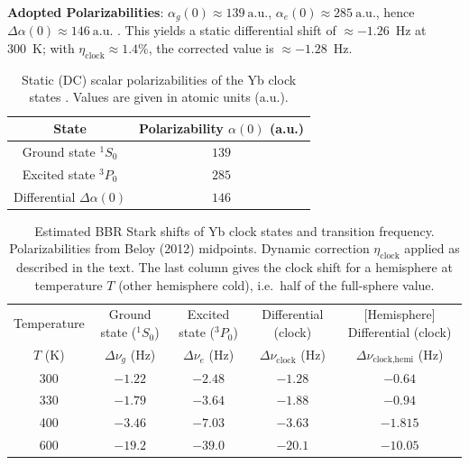 \documentclass[aps,pra, onecolumn,superscriptaddress,nopacs,floatfix, showkeys, notitlepage]{revtex4-1}
\begin{document}
{\bf Adopted Polarizabilities}:
$\alpha_g(0)\approx 139~\mathrm{a.u.}$, $\alpha_e(0)\approx 285~\mathrm{a.u.}$, hence $\Delta\alpha(0)\approx 146~\mathrm{a.u.}$ \cite{Beloy2012}.  
This yields a static differential shift of $\approx -1.26$~Hz at 300~K; with $\eta_\text{clock}\approx 1.4\%$, the corrected value is $\approx -1.28$~Hz.

\begin{table}[h!]
\centering
\caption{Static (DC) scalar polarizabilities of the Yb clock states \cite{Beloy2012}. 
Values are given in atomic units (a.u.).}
\begin{tabular}{c c}
\hline
State & Polarizability $\alpha(0)$ (a.u.) \\
\hline
Ground state ${}^{1}S_{0}$ & $139$ \\
Excited state ${}^{3}P_{0}$ & $285$ \\
\hline
Differential $\Delta\alpha(0)$ & $146$ \\
\hline
\end{tabular}
\end{table}


\begin{table}[h!]
\centering
\caption{Estimated BBR Stark shifts of Yb clock states and transition frequency. 
Polarizabilities from Beloy (2012) midpoints. Dynamic correction 
$\eta_\text{clock}$ applied as described in the text. The last column gives the
clock shift for a hemisphere at temperature $T$ (other hemisphere cold), i.e.\ half of the full-sphere value.}
\begin{tabular}{c c c c | c}
\hline
Temperature & Ground state (${}^{1}S_{0}$) & Excited state (${}^{3}P_{0}$) & Differential (clock) & [Hemisphere] Differential (clock) \\
$T$ (K) & $\Delta\nu_g$ (Hz) & $\Delta\nu_e$ (Hz) & $\Delta\nu_{\text{clock}}$ (Hz) & $\Delta\nu_{\text{clock,hemi}}$ (Hz) \\
\hline
300 & $-1.22$ & $-2.48$ & $-1.28$ & $-0.64$ \\
330 & $-1.79$ & $-3.64$ & $-1.88$ & $-0.94$ \\
400 & $-3.46$ & $-7.03$ & $-3.63$ & $-1.815$ \\
600 & $-19.2$ & $-39.0$ & $-20.1$ & $-10.05$ \\
\hline
\end{tabular}
\end{table}
\end{document}
